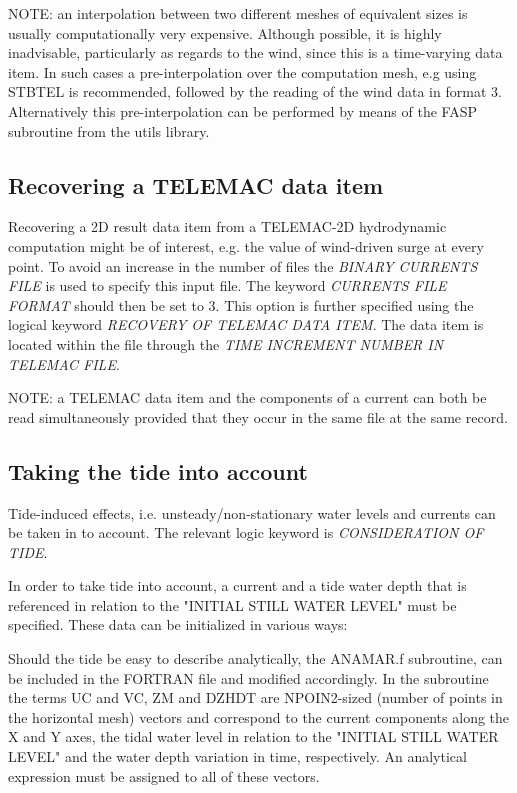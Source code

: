  NOTE: an interpolation between two different meshes of equivalent sizes is usually computationally very expensive. Although possible, it is highly inadvisable, particularly as regards to the wind, since this is a time-varying data item. In such cases a pre-interpolation over the computation mesh, e.g using STBTEL is recommended, followed by the reading of the wind data in format 3. Alternatively this pre-interpolation can be performed by means of the FASP subroutine from the utils library.


\subsection{ Recovering a TELEMAC data item}
\label{se:telemacdata}
 Recovering a 2D result data item from a TELEMAC-2D hydrodynamic computation might be of interest, e.g. the value of wind-driven surge at every point. To avoid an increase in the number of files the \textit{BINARY CURRENTS FILE} is used to specify this input file. The keyword \textit{CURRENTS FILE FORMAT} should then be set to 3. This option is further specified using the logical keyword \textit{RECOVERY OF TELEMAC DATA ITEM}. The data item is located within the file through the \textit{TIME INCREMENT NUMBER IN TELEMAC FILE}.

 NOTE: a TELEMAC data item and the components of a current can both be read simultaneously provided that they occur in the same file at the same record.



\subsection{ Taking the tide into account}
\label{se:tide}
 Tide-induced effects, i.e. unsteady/non-stationary water levels and currents can be taken in to account. The relevant logic keyword is \textit{CONSIDERATION OF TIDE}.

 In order to take tide into account, a current and a tide water depth that is referenced in relation to the "INITIAL STILL WATER LEVEL" must be specified. These data can be initialized in various ways:

 Should the tide be easy to describe analytically, the ANAMAR.f subroutine, can be included in the FORTRAN file and modified accordingly. In the subroutine the terms UC and VC, ZM and DZHDT are NPOIN2-sized (number of points in the horizontal mesh) vectors and correspond to the current components along the X and Y axes, the tidal water level in relation to the "INITIAL STILL WATER LEVEL" and the water depth variation in time, respectively. An analytical expression must be assigned to all of these vectors.

